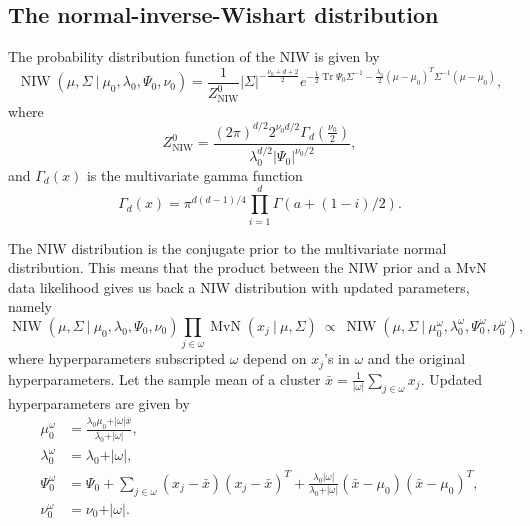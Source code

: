 \documentclass[11pt, oneside]{article}   	%
\DeclareMathOperator{\Tr}{Tr}
\DeclareMathOperator{\NIW}{NIW}
\begin{document}
\subsection{The normal-inverse-Wishart distribution}
The probability distribution function of the NIW is given by
\begin{equation}
\NIW(\mu, \Sigma~\vert~\mu_0, \lambda_0,\Psi_0,\nu_0) = \frac{1}{Z_{\NIW}^0} \vert\Sigma\vert^{-\frac{\nu_0 + d + 2}{2}}e^{-\frac{1}{2}\Tr\Psi_0\Sigma^{-1} - \frac{\lambda_0}{2}(\mu - \mu_0)^T\Sigma^{-1}(\mu - \mu_0)},
\label{eq:NIW}\end{equation}
where 
$$Z_{\NIW}^0 = \frac{(2\pi)^{d/2} 2^{\nu_0 d/2} \Gamma_d(\frac{\nu_0}{2})}{\lambda_0^{d/2}\vert\Psi_0\vert^{\nu_0/2}},$$
and $\Gamma_d(x)$ is the multivariate gamma function
$$\Gamma_d(x) = \pi^{d(d-1)/4}\prod_{i=1}^d\Gamma(a + (1 - i)/2).$$

The NIW distribution is the conjugate prior to the multivariate normal distribution. This means that the product between the NIW prior and a MvN data likelihood gives us back a NIW distribution with updated parameters, namely
\begin{equation}\NIW(\mu, \Sigma~\vert~ \mu_0, \lambda_0,\Psi_0,\nu_0)\prod_{j\in\omega}\operatorname{MvN}(x_j~\vert~\mu,\Sigma)~\propto~\NIW(\mu,\Sigma~\vert~\mu_0^\omega,\lambda_0^\omega,\Psi_0^\omega,\nu_0^\omega),
\label{eq:conjugation}\end{equation}
where hyperparameters subscripted $\omega$ depend on $x_j$'s in $\omega$ and the original hyperparameters. Let the sample mean of a cluster $\bar x = \frac{1}{\vert\omega\vert}\sum_{j\in\omega} x_j$. Updated hyperparameters are given by
\begin{equation}\begin{split}
\mu_0^\omega &= \frac{\lambda_0 \mu_0 + \vert\omega\vert \bar x}{\lambda_0 + \vert\omega\vert}, \\
\lambda_0^\omega &= \lambda_0 + \vert\omega\vert,\\
\Psi_0^\omega &= \Psi_0 + \sum_{j\in\omega}(x_j - \bar x)(x_j - \bar x)^T + \frac{\lambda_0\vert\omega\vert}{\lambda_0 + \vert\omega\vert}(\bar x - \mu_0)(\bar x - \mu_0)^T,\\
\nu_0^\omega &= \nu_0 + \vert\omega\vert.
\label{eq:updatedhp}\end{split}\end{equation}
\end{document}
